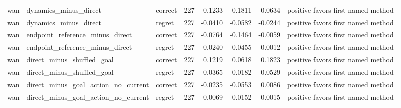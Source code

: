 \begin{tabular}{lllrrrrl}
wan & dynamics\_minus\_direct & correct & 227 & -0.1233 & -0.1811 & -0.0634 & positive favors first named method \\
wan & dynamics\_minus\_direct & regret & 227 & -0.0410 & -0.0582 & -0.0244 & positive favors first named method \\
wan & endpoint\_reference\_minus\_direct & correct & 227 & -0.0764 & -0.1464 & -0.0059 & positive favors first named method \\
wan & endpoint\_reference\_minus\_direct & regret & 227 & -0.0240 & -0.0455 & -0.0012 & positive favors first named method \\
wan & direct\_minus\_shuffled\_goal & correct & 227 & 0.1219 & 0.0618 & 0.1823 & positive favors first named method \\
wan & direct\_minus\_shuffled\_goal & regret & 227 & 0.0365 & 0.0182 & 0.0529 & positive favors first named method \\
wan & direct\_minus\_goal\_action\_no\_current & correct & 227 & -0.0235 & -0.0553 & 0.0086 & positive favors first named method \\
wan & direct\_minus\_goal\_action\_no\_current & regret & 227 & -0.0069 & -0.0152 & 0.0015 & positive favors first named method \\
\bottomrule
\end{tabular}
